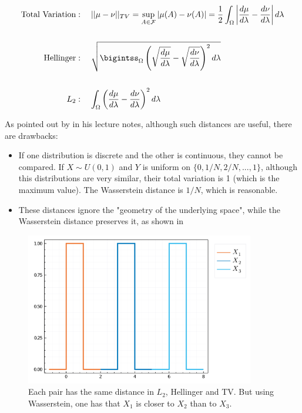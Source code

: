 \documentclass[10pt]{article}
\begin{document}
\begin{align*} 
\text{Total Variation} &: \quad || \mu - \nu ||_{TV} =
\sup_{A \in \mathcal F} |\mu (A) - \nu(A)| = 
\frac{1}{2}\int_\Omega \left | \frac{d\mu}{d\lambda} - \frac{d\nu}{d\lambda} \right
|d\lambda \\
\\
\text{Hellinger} &: \quad \sqrt{\bigintss_\Omega \left(\sqrt{\frac{d\mu}{d\lambda}} -
\sqrt{\frac{d\nu}{d\lambda}} \right )^2d\lambda} \\
\\
L_2 &: \quad \int_\Omega \left(\frac{d\mu}{d\lambda} - \frac{d\nu}{d\lambda}\right)^2
d\lambda \\
\end{align*}

As pointed out by \citet{wassermanStatisicalMethods2018} in his lecture notes,
although such distances are useful, there are drawbacks:
\begin{itemize}
	\item If one distribution is discrete and the other is continuous,  they cannot
	be compared. If $X \sim U(0,1)$ and $Y$ is uniform on $\{0,1/N, 2/N,...,1\}$,
	although this distributions are very similar, their total variation is 1 (which is
	the maximum value). The Wasserstein distance is $1/N$, which is reasonable.
	\item These distances ignore the "geometry of the underlying space", while the
	Wasserstein distance preserves it, as shown in 
\end{itemize}
\begin{figure}
	\centering
	\includegraphics[width=10cm]{images/Distributions_Distances.png}
    \caption{Each pair has the same distance in $L_2$, Hellinger and TV. But using
    Wasserstein, one has that $X_1$ is closer to $X_2$ than to $X_3$.}
\end{figure}
\end{document}
